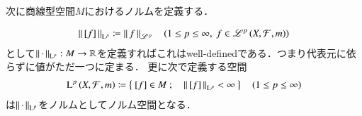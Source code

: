 次に商線型空間$M$におけるノルムを定義する．
\begin{itembox}[l]{}
	\begin{lem}
		\begin{align}
			\left\|\, [f]\, \right\|_{\mathrm{L}^p} \coloneqq \left\|\, f\, \right\|_{\mathscr{L}^p} \quad (1 \leq p \leq \infty,\ f \in \mathscr{L}^{p} \left(X,\mathcal{F},m\right))
		\end{align}
		として$\left\|\, \cdot\, \right\|_{\mathrm{L}^p}:M \rightarrow \mathbb{R}$を定義すればこれはwell-definedである．つまり代表元に依らずに値がただ一つに定まる．
		更に次で定義する空間
		\begin{align}
			\operatorname{L}^{p} \left(X,\mathcal{F},m\right) \coloneqq \left\{\ [f] \in M\ ;\quad \left\|\, [f]\, \right\|_{\mathrm{L}^p} < \infty\ \right\} \quad (1 \leq p \leq \infty)
		\end{align}
		は$\left\|\, \cdot\, \right\|_{\mathrm{L}^p}$をノルムとしてノルム空間となる．
	\end{lem}
\end{itembox}
